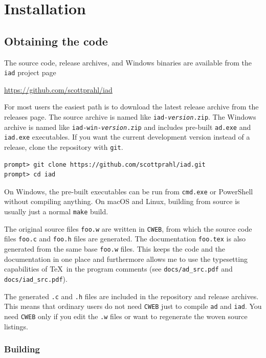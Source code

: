 \documentclass{article}
\newcommand\iadprog{\texttt{iad}}
\begin{document}
\clearpage
\section{Installation}

\subsection{Obtaining the code}

The source code, release archives, and Windows binaries are available from the
\texttt{iad} project page

\begin{center}
\url{https://github.com/scottprahl/iad}
\end{center}

For most users the easiest path is to download the latest release archive from
the releases page.  The source archive is named like
\texttt{iad-\textit{version}.zip}.  The Windows archive is named like
\texttt{iad-win-\textit{version}.zip} and includes pre-built
\texttt{ad.exe} and \texttt{iad.exe} executables.  If you want the current
development version instead of a release, clone the repository with
\texttt{git}.

\begin{verbatim}
prompt> git clone https://github.com/scottprahl/iad.git
prompt> cd iad
\end{verbatim}

On Windows, the pre-built executables can be run from \texttt{cmd.exe} or
PowerShell without compiling anything.  On macOS and Linux, building from
source is usually just a normal \texttt{make} build.

The original source files \texttt{foo.w} are written in \texttt{CWEB}, from which the
source code files \texttt{foo.c} and \texttt{foo.h} files are 
generated.  The documentation \texttt{foo.tex} is also generated from the same
base \texttt{foo.w} files.  This keeps the code and the documentation in one
place and furthermore allows me to use the typesetting  capabilities of \TeX\ in
the program comments (see \texttt{docs/ad\_src.pdf} and \texttt{docs/iad\_src.pdf}).

The generated \texttt{.c} and \texttt{.h} files are included in the repository
and release archives.  This means that ordinary users do not need
\texttt{CWEB} just to compile \texttt{ad} and \iadprog{}.  You need
\texttt{CWEB} only if you edit the \texttt{.w} files or want to regenerate the
woven source listings.

\subsubsection{Building}
\end{document}
